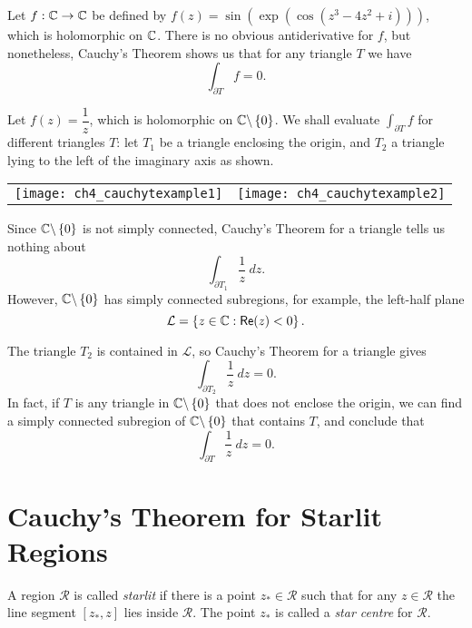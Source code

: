 \begin{example}
Let $f:\mathbb{C} \to \mathbb{C}$ be defined by $f(z)=\sin \left( \exp \left( \cos \left( z^3-4z^2+i \right) \right) \right)$, which is holomorphic on $\mathbb{C}$.  There is no obvious antiderivative for $f$, but nonetheless, Cauchy's Theorem shows us that for any triangle $T$ we have
\[
\int_{\partial T} f = 0.
\]
\end{example}
\begin{example}
Let $f(z) = \dfrac{1}{z}$, which is holomorphic on $\mathbb{C} \backslash \left\{0\right\}$.  We shall evaluate $\int_{\partial T} f$ for different triangles $T$: let $T_1$ be a triangle enclosing the origin, and $T_2$ a triangle lying to the left of the imaginary axis as shown.
\begin{center}
\begin{tabular}{cc}
\texttt{[image: ch4\_cauchytexample1]} & \texttt{[image: ch4\_cauchytexample2]}
\end{tabular}
\end{center}
\end{example}
\begin{solution}
Since $\mathbb{C} \backslash \left\{0\right\}$ is not simply connected, Cauchy's Theorem for a triangle tells us nothing about
\[
\int_{\partial T_1} \frac{1}{z}\ dz.
\]
However, $\mathbb{C} \backslash \left\{0\right\}$ has simply connected subregions, for example, the left-half plane
\[
\mathcal{L} = \left\{ z \in \mathbb{C} : \textsf{Re} (z) < 0 \right\}.
\]

The triangle $T_2$ is contained in $\mathcal{L}$, so Cauchy's Theorem for a triangle gives
\[
\int_{\partial T_2} \frac{1}{z}\ dz =0.
\]
In fact, if $T$ is any triangle in $\mathbb{C} \backslash \left\{0\right\}$ that does not enclose the origin, we can find a simply connected subregion of $\mathbb{C} \backslash \left\{0\right\}$ that contains $T$, and conclude that
\[
\int_{\partial T} \frac{1}{z}\ dz =0.
\]
\end{solution}
\section{Cauchy's Theorem for Starlit Regions}

\begin{definition}
A region $\mathcal{R}$ is called \emph{starlit} if there is a point $z_{\ast} \in \mathcal{R}$ such that for any $z \in \mathcal{R}$ the line segment $[z_{\ast},z]$ lies inside $\mathcal{R}$.  The point $z_{\ast}$ is called a \emph{star centre} for $\mathcal{R}$.
\end{definition}

